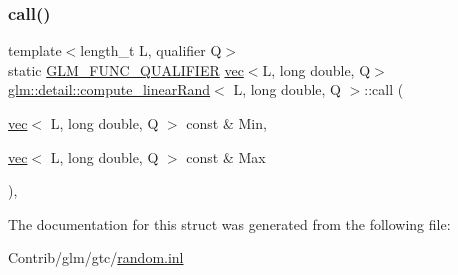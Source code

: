 \subsubsection{\texorpdfstring{call()}{call()}}
{\footnotesize\ttfamily template$<$length\+\_\+t L, qualifier Q$>$ \\
static \mbox{\hyperlink{setup_8hpp_a33fdea6f91c5f834105f7415e2a64407}{G\+L\+M\+\_\+\+F\+U\+N\+C\+\_\+\+Q\+U\+A\+L\+I\+F\+I\+ER}} \mbox{\hyperlink{structglm_1_1vec}{vec}}$<$L, long double, Q$>$ \mbox{\hyperlink{structglm_1_1detail_1_1compute__linear_rand}{glm\+::detail\+::compute\+\_\+linear\+Rand}}$<$ L, long double, Q $>$\+::call (\begin{DoxyParamCaption}\item[{\mbox{\hyperlink{structglm_1_1vec}{vec}}$<$ L, long double, Q $>$ const \&}]{Min,  }\item[{\mbox{\hyperlink{structglm_1_1vec}{vec}}$<$ L, long double, Q $>$ const \&}]{Max }\end{DoxyParamCaption})\hspace{0.3cm}{\ttfamily [inline]}, {\ttfamily [static]}}



The documentation for this struct was generated from the following file\+:\begin{DoxyCompactItemize}
\item 
Contrib/glm/gtc/\mbox{\hyperlink{random_8inl}{random.\+inl}}\end{DoxyCompactItemize}
